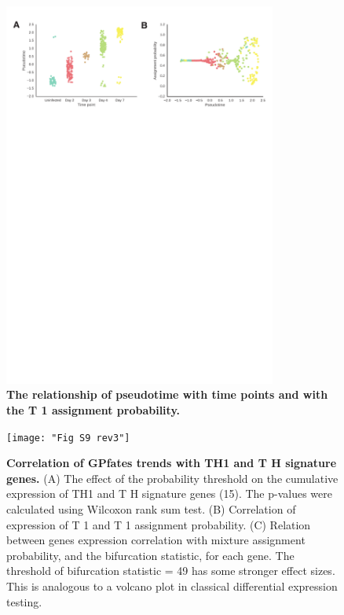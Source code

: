\begin{figure}
    \centering
    \includegraphics[width=0.8\textwidth]{"Fig S8 rev3"}
    \caption[The relationship of pseudotime with time points and with the T 1 assignment probability]{\textbf{The relationship of pseudotime with time points and with the T 1 assignment probability.}}
    \label{fig:ms8}
\end{figure}

\begin{figure}
    \centering
    \texttt{[image: "Fig S9 rev3"]}
    \caption[Correlation of GPfates trends with TH1 and T H signature genes]{\textbf{Correlation of GPfates trends with TH1 and T H signature genes.} (A) The effect of the probability threshold on the cumulative expression of TH1 and T H signature genes (15). The p-values were calculated using Wilcoxon rank sum test. (B) Correlation of expression of T 1 and T 1 assignment probability. (C) Relation between genes expression correlation with mixture assignment probability, and the bifurcation statistic, for each gene. The threshold of bifurcation statistic = 49 has some stronger effect sizes. This is analogous to a volcano plot in classical differential expression testing.}
    \label{fig:ms9}
\end{figure}

